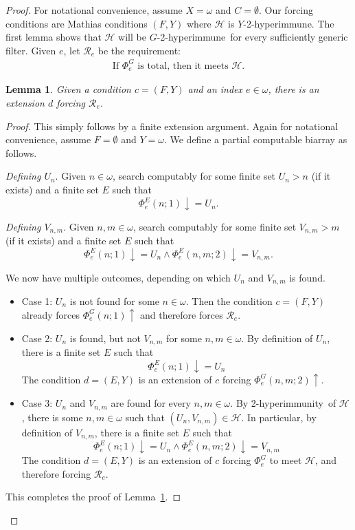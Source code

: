 \documentclass{amsart}
\newtheorem{lemma}[theorem]{Lemma}
\theoremstyle{definition}
\theoremstyle{remark}
\numberwithin{equation}{section}
\theoremstyle{noparens}
\def\propertyL{2-hyperimmunity}
\def\hyper{2-hyperimmune}
\newcommand{\Hcal}{\mathcal{H}}
\newcommand{\Rcal}{\mathcal{R}}
\begin{document}
\begin{proof}
For notational convenience, assume $X=\omega$ and $C = \emptyset$.
Our forcing conditions are Mathias conditions $(F, Y)$ where $\Hcal$ is $  Y$-\hyper.
The first lemma shows that $\Hcal$ will be $  G$-\hyper\ for every sufficiently generic filter.
Given $e$, let $\Rcal_e$ be the requirement:
\begin{align}\nonumber
\text{If $\Phi^{ G}_e$ is total, then it meets $\Hcal$.}
\end{align}

\begin{lemma}\label{lem:mathias-double-immunity}
Given a condition $c = (F, Y)$ and an index $e \in \omega$,
there is an extension $d$ forcing $\Rcal_e$.
\end{lemma}
\begin{proof}
This simply follows by a finite extension argument.
Again for notational convenience, assume $F=\emptyset$ and $Y=\omega$.
 We define a partial  computable biarray as follows.
\bigskip

\emph{Defining $U_n$}.
Given $n \in \omega$, search  computably for some
finite   set $U_n>n$ (if it exists) and a finite set $E  $
such that
$$
\Phi_e^{   E}(n;1) \downarrow = U_n.
$$

\emph{Defining $V_{n,m}$}. Given $n, m \in \omega$, search computably for some
finite set $V_{n,m}>m$ (if it exists) and a finite set $E  $ such that
$$
\Phi_e^{  E}(n;1) \downarrow = U_n
	\wedge \Phi_e^{  E}(n, m;2) \downarrow = V_{n,m}.
$$
\smallskip

We now have multiple outcomes, depending on which $U_n$ and $V_{n,m}$ is found.
\begin{itemize}
	\item Case 1: $U_n$ is not found for some $n \in \omega$.
	Then the condition $c = (F, Y)$ already forces  $\Phi_e^{ G}(n;1) \uparrow$
	and therefore forces $\Rcal_e$.

	\item Case 2: $U_n$ is found, but not $V_{n,m}$ for some $n, m \in \omega$.
	By definition of $U_n$, there is a finite set $E  $ such that
	$$
	\Phi_e^{   E }(n;1) \downarrow = U_n
	$$
	The condition $d = ( E, Y)$ is an extension of $c$
	forcing  $\Phi_e^{  G}(n,m; 2) \uparrow$.

	\item Case 3: $U_n$ and $V_{n,m}$ are found for every $n,m \in \omega$.
	By  \propertyL\ of $\Hcal$, there is some $n, m \in \omega$
	such that $(U_n, V_{n,m}) \in \Hcal$.
	In particular, by definition of $V_{n,m}$, there is a finite set $E  $ such that
	$$
	\Phi_e^{  E}(n;1) \downarrow = U_n
		\wedge \Phi_e^{  E}(n, m;2) \downarrow = V_{n,m}
	$$
	The condition $d = (  E, Y )$ is an extension of $c$ forcing
	$\Phi^{  G}_e$ to meet $\Hcal$, and therefore forcing $\Rcal_e$.
\end{itemize}
This completes the proof of Lemma~\ref{lem:mathias-double-immunity}.
\end{proof}


\end{proof}
\end{document}
